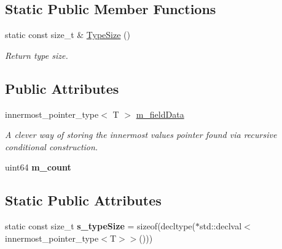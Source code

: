 \subsection*{Static Public Member Functions}
\begin{DoxyCompactItemize}
\item 
static const size\+\_\+t \& \mbox{\hyperlink{structrev_1_1_protocol_field_info_a48e96e4c04c0a242bd87c5ef46f0b2b5}{Type\+Size}} ()
\begin{DoxyCompactList}\small\item\em Return type size. \end{DoxyCompactList}\end{DoxyCompactItemize}
\subsection*{Public Attributes}
\begin{DoxyCompactItemize}
\item 
\mbox{\label{structrev_1_1_protocol_field_info_ae1a334704618e6a2082afdea58600c3e}} 
innermost\+\_\+pointer\+\_\+type$<$ T $>$ \mbox{\hyperlink{structrev_1_1_protocol_field_info_ae1a334704618e6a2082afdea58600c3e}{m\+\_\+field\+Data}}
\begin{DoxyCompactList}\small\item\em A clever way of storing the innermost value\textquotesingle{}s pointer found via recursive conditional construction. \end{DoxyCompactList}\item 
\mbox{\label{structrev_1_1_protocol_field_info_afc64e3a35c5a0ca9076c9b5a9845c78b}} 
uint64 {\bfseries m\+\_\+count}
\end{DoxyCompactItemize}
\subsection*{Static Public Attributes}
\begin{DoxyCompactItemize}
\item 
\mbox{\label{structrev_1_1_protocol_field_info_aabec183bc402f17c7f9c0375a5e331a6}} 
static const size\+\_\+t {\bfseries s\+\_\+type\+Size} = sizeof(decltype($\ast$std\+::declval$<$innermost\+\_\+pointer\+\_\+type$<$T$>$$>$()))
\end{DoxyCompactItemize}


